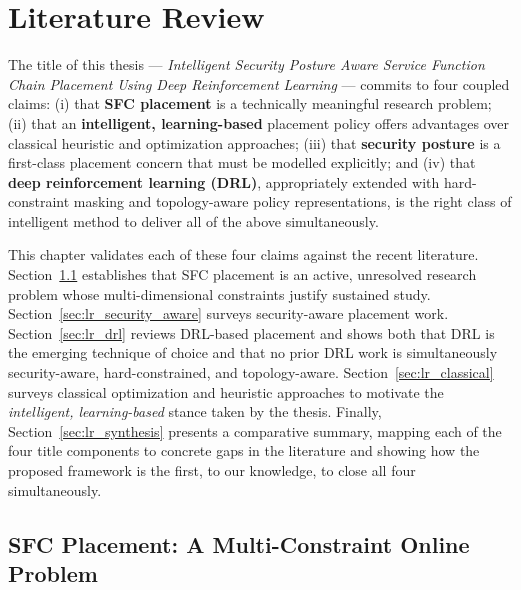 \chapter{Literature Review}

The title of this thesis --- \textit{Intelligent Security Posture
Aware Service Function Chain Placement Using Deep Reinforcement
Learning} --- commits to four coupled claims: (i) that \textbf{SFC
placement} is a technically meaningful research problem; (ii) that an
\textbf{intelligent, learning-based} placement policy offers
advantages over classical heuristic and optimization approaches; (iii)
that \textbf{security posture} is a
first-class placement concern that must be modelled explicitly; and
(iv) that \textbf{deep reinforcement learning (DRL)}, appropriately
extended with hard-constraint masking and topology-aware policy
representations, is the right class of intelligent method to deliver
all of the above simultaneously.

This chapter validates each of these four claims against the recent
literature. Section~\ref{sec:lr_sfc_placement_problem} establishes
that SFC placement is an active, unresolved research problem whose
multi-dimensional constraints justify sustained study.
Section~\ref{sec:lr_security_aware} surveys security-aware placement
work. Section~\ref{sec:lr_drl} reviews DRL-based placement and
shows both that DRL is the emerging technique of choice and that no
prior DRL work is simultaneously security-aware, hard-constrained, and
topology-aware. Section~\ref{sec:lr_classical} surveys classical
optimization and heuristic approaches to motivate the
\textit{intelligent, learning-based} stance taken by the thesis.
Finally, Section~\ref{sec:lr_synthesis} presents a comparative
summary, mapping each of the four title components to concrete gaps
in the literature and showing how the proposed framework is the
first, to our knowledge, to close all four simultaneously.

\section{SFC Placement: A Multi-Constraint Online Problem}
\label{sec:lr_sfc_placement_problem}

